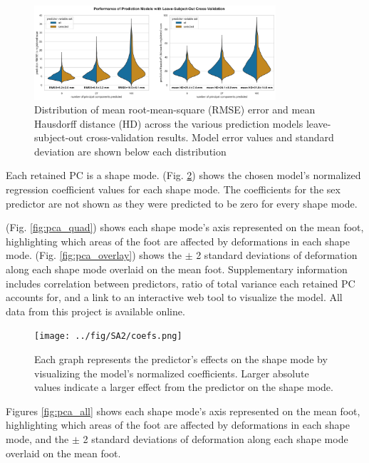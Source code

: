 \documentclass[defaultstyle,11pt]{comps}
\begin{document}
\begin{figure}
\hypertarget{fig:modelperf}{%
\centering
\includegraphics[width=0.8\textwidth,height=\textheight]{../fig/SA2/modelPerformance.png}
\caption{Distribution of mean root-mean-square (RMSE) error and mean Hausdorff distance (HD) across the various prediction models leave-subject-out cross-validation results. Model error values and standard deviation are shown below each distribution}\label{fig:modelperf}
}
\end{figure}

Each retained PC is a shape mode.
(Fig. \ref{fig:SA2-coefs}) shows the chosen model's normalized regression coefficient values for each shape mode.
The coefficients for the sex predictor are not shown as they were predicted to be zero for every shape mode.

(Fig. \ref{fig:pca_quad}) shows each shape mode's axis represented on the mean foot, highlighting which areas of the foot are affected by deformations in each shape mode.
(Fig. \ref{fig:pca_overlay}) shows the \(\pm\) 2 standard deviations of deformation along each shape mode overlaid on the mean foot.
Supplementary information includes correlation between predictors, ratio of total variance each retained PC accounts for, and a link to an interactive web tool to visualize the model.
All data from this project is available online.

\begin{figure}
\hypertarget{fig:SA2-coefs}{%
\centering
\texttt{[image: ../fig/SA2/coefs.png]}
\caption{Each graph represents the predictor's effects on the shape mode by visualizing the model's normalized coefficients. Larger absolute values indicate a larger effect from the predictor on the shape mode.}\label{fig:SA2-coefs}
}
\end{figure}

Figures \ref{fig:pca_all} shows each shape mode's axis represented on the mean foot, highlighting which areas of the foot are affected by deformations in each shape mode, and the \(\pm\) 2 standard deviations of deformation along each shape mode overlaid on the mean foot.
\end{document}
